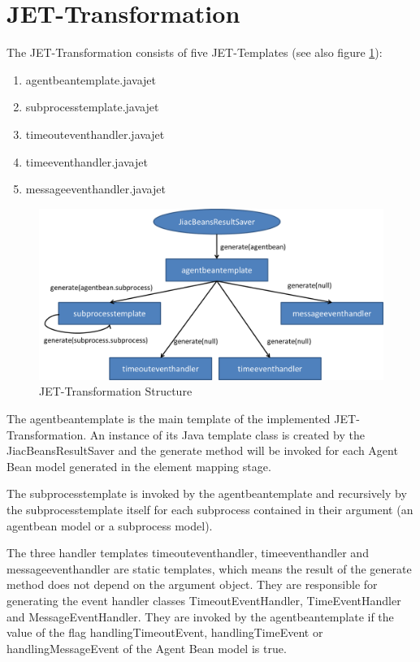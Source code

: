 \section{JET-Transformation}
The JET-Transformation consists of five JET-Templates (see also figure \ref{fig:transformation_structure}): 
\begin{enumerate}
	\item agentbeantemplate.javajet
	\item subprocesstemplate.javajet
	\item timeouteventhandler.javajet
	\item timeeventhandler.javajet
	\item messageeventhandler.javajet
\end{enumerate}

\begin{figure}[h]
	\centering\includegraphics[width=1.0\textwidth]{images/templates_structure.png}
	\caption{JET-Transformation Structure}
	\label{fig:transformation_structure}
\end{figure}

The agentbeantemplate is the main template of the implemented JET-Transformation. An instance of its Java template class is created by the JiacBeansResultSaver and the generate method will be invoked for each Agent Bean model generated in the element mapping stage. 

The subprocesstemplate is invoked by the agentbeantemplate and recursively by the subprocesstemplate itself for each subprocess contained in their argument (an agentbean model or a subprocess model). 

The three handler templates timeouteventhandler, timeeventhandler and messageeventhandler are static templates, which means the result of the generate method does not depend on the argument object. They are responsible for generating the event handler classes TimeoutEventHandler, TimeEventHandler and MessageEventHandler. They are invoked by the agentbeantemplate if the value of the flag handlingTimeoutEvent, handlingTimeEvent or handlingMessageEvent of the Agent Bean model is true.



